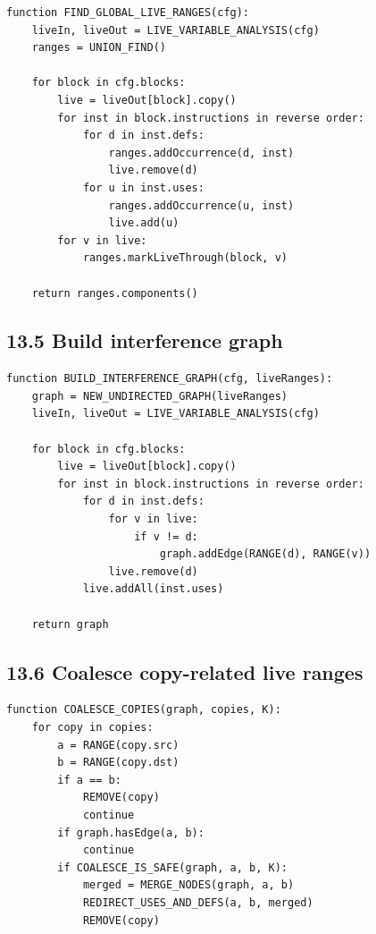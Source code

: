 \documentclass[10pt,letterpaper]{article}
\begin{document}
\begin{verbatim}
function FIND_GLOBAL_LIVE_RANGES(cfg):
    liveIn, liveOut = LIVE_VARIABLE_ANALYSIS(cfg)
    ranges = UNION_FIND()

    for block in cfg.blocks:
        live = liveOut[block].copy()
        for inst in block.instructions in reverse order:
            for d in inst.defs:
                ranges.addOccurrence(d, inst)
                live.remove(d)
            for u in inst.uses:
                ranges.addOccurrence(u, inst)
                live.add(u)
        for v in live:
            ranges.markLiveThrough(block, v)

    return ranges.components()
\end{verbatim}

\subsection*{13.5 Build interference graph}

\begin{verbatim}
function BUILD_INTERFERENCE_GRAPH(cfg, liveRanges):
    graph = NEW_UNDIRECTED_GRAPH(liveRanges)
    liveIn, liveOut = LIVE_VARIABLE_ANALYSIS(cfg)

    for block in cfg.blocks:
        live = liveOut[block].copy()
        for inst in block.instructions in reverse order:
            for d in inst.defs:
                for v in live:
                    if v != d:
                        graph.addEdge(RANGE(d), RANGE(v))
                live.remove(d)
            live.addAll(inst.uses)

    return graph
\end{verbatim}

\subsection*{13.6 Coalesce copy-related live ranges}

\begin{verbatim}
function COALESCE_COPIES(graph, copies, K):
    for copy in copies:
        a = RANGE(copy.src)
        b = RANGE(copy.dst)
        if a == b:
            REMOVE(copy)
            continue
        if graph.hasEdge(a, b):
            continue
        if COALESCE_IS_SAFE(graph, a, b, K):
            merged = MERGE_NODES(graph, a, b)
            REDIRECT_USES_AND_DEFS(a, b, merged)
            REMOVE(copy)
\end{verbatim}
\end{document}
